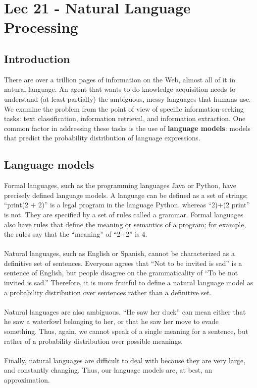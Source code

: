 \chapter{Lec 21 - Natural Language Processing}

\section{Introduction}
There are over a trillion pages of information on the Web, almost all of it in natural language. An agent that wants to do knowledge acquisition needs to understand (at least partially) the ambiguous, messy languages that humans use. We examine the problem from the point of view of specific information-seeking tasks: text classification, information retrieval, and information extraction. One common factor in addressing these tasks is the use of \textbf{language models}: models that predict the probability distribution of language expressions.

\section{Language models}
Formal languages, such as the programming languages Java or Python, have precisely defined language models. A language can be defined as a set of strings; “print(2 + 2)” is a legal program in the language Python, whereas “2)+(2 print” is not. They are specified by a set of rules called a grammar. Formal languages also have rules that define the meaning or semantics of a program; for example, the rules say that the “meaning” of “2+2” is 4.\\\\
Natural languages, such as English or Spanish, cannot be characterized as a definitive set of sentences. Everyone agrees that “Not to be invited is sad” is a sentence of English, but people disagree on the grammaticality of “To be not invited is sad.” Therefore, it is more fruitful to define a natural language model as a probability distribution over sentences rather than a definitive set.\\\\
Natural languages are also ambiguous. “He saw her duck” can mean either that he saw a waterfowl belonging to her, or that he saw her move to evade something. Thus, again, we cannot speak of a single meaning for a sentence, but rather of a probability distribution over possible meanings.\\\\
Finally, natural languages are difficult to deal with because they are very large, and constantly changing. Thus, our language models are, at best, an approximation.

